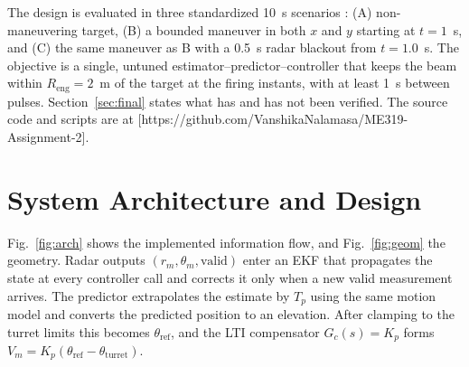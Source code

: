 \documentclass[conference]{IEEEtran}
\newcommand{\Tp}{T_p}
\newcommand{\Kp}{K_p}
\begin{document}
The design is evaluated in three standardized 10~s scenarios \cite{assign}: (A) non-maneuvering target, (B) a bounded maneuver in both $x$ and $y$ starting at $t=1$~s, and (C) the same maneuver as B with a 0.5~s radar blackout from $t=1.0$~s. The objective is a single, untuned estimator--predictor--controller that keeps the beam within $R_\mathrm{eng}=2$~m of the target at the firing instants, with at least 1~s between pulses. Section~\ref{sec:final} states what has and has not been verified. The source code and scripts are at 
[https://github.com/VanshikaNalamasa/ME319-Assignment-2].

\section{System Architecture and Design}

Fig.~\ref{fig:arch} shows the implemented information flow, and Fig.~\ref{fig:geom} the geometry. Radar outputs $(r_m,\theta_m,\text{valid})$ enter an EKF that propagates the state at every controller call and corrects it only when a new valid measurement arrives. The predictor extrapolates the estimate by $\Tp$ using the same motion model and converts the predicted position to an elevation. After clamping to the turret limits this becomes $\theta_\mathrm{ref}$, and the LTI compensator $G_c(s)=\Kp$ forms $V_m=\Kp(\theta_\mathrm{ref}-\theta_\mathrm{turret})$.
\end{document}
